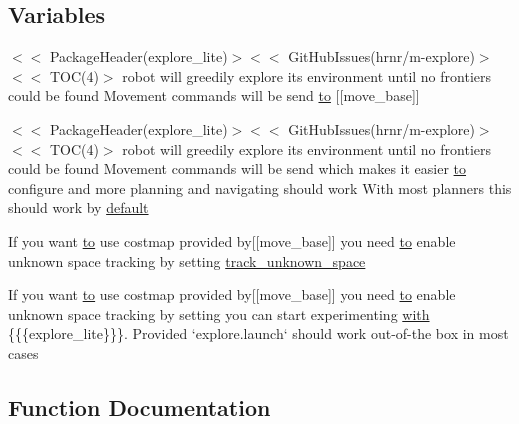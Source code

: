 \subsection*{Variables}
\begin{DoxyCompactItemize}
\item 
$<$$<$ Package\+Header(explore\+\_\+lite)$>$$<$$<$ Git\+Hub\+Issues(hrnr/m-\/explore)$>$$<$$<$ T\+OC(4)$>$ robot will greedily explore its environment until no frontiers could be found Movement commands will be send \hyperlink{wiki__doc_8txt_a59f010b39e38734a32109cf8c8310f81}{to} \mbox{[}\mbox{[}move\+\_\+base\mbox{]}\mbox{]}
\item 
$<$$<$ Package\+Header(explore\+\_\+lite)$>$$<$$<$ Git\+Hub\+Issues(hrnr/m-\/explore)$>$$<$$<$ T\+OC(4)$>$ robot will greedily explore its environment until no frontiers could be found Movement commands will be send which makes it easier \hyperlink{wiki__doc_8txt_a59f010b39e38734a32109cf8c8310f81}{to} configure and more planning and navigating should work With most planners this should work by \hyperlink{wiki__doc_8txt_a2da1dda6a041d7dbeb3aef440c695a60}{default}
\item 
If you want \hyperlink{wiki__doc_8txt_a59f010b39e38734a32109cf8c8310f81}{to} use costmap provided by\mbox{[}\mbox{[}move\+\_\+base\mbox{]}\mbox{]} you need \hyperlink{wiki__doc_8txt_a59f010b39e38734a32109cf8c8310f81}{to} enable unknown space tracking by setting \hyperlink{wiki__doc_8txt_aae8355eda2c5eda5fc33ae2b62ba937c}{track\+\_\+unknown\+\_\+space}
\item 
If you want \hyperlink{wiki__doc_8txt_a59f010b39e38734a32109cf8c8310f81}{to} use costmap provided by\mbox{[}\mbox{[}move\+\_\+base\mbox{]}\mbox{]} you need \hyperlink{wiki__doc_8txt_a59f010b39e38734a32109cf8c8310f81}{to} enable unknown space tracking by setting you can start experimenting \hyperlink{wiki__doc_8txt_a110243189100ad190f1295ade52a39a6}{with} \{\{\{explore\+\_\+lite\}\}\}. Provided `explore.\+launch` should work out-\/of-\/the box in most cases
\end{DoxyCompactItemize}


\subsection{Function Documentation}
